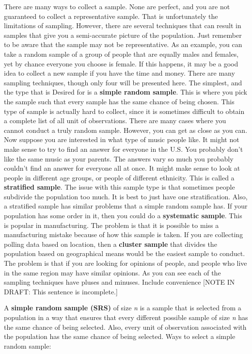 \documentclass[]{book}
\begin{document}
There are many ways to collect a sample. None are perfect, and you are not guaranteed to collect a representative sample. That is unfortunately the limitations of sampling. However, there are several techniques that can result in samples that give you a semi-accurate picture of the population. Just remember to be aware that the sample may not be representative. As an example, you can take a random sample of a group of people that are equally males and females, yet by chance everyone you choose is female. If this happens, it may be a good idea to collect a new sample if you have the time and money.
There are many sampling techniques, though only four will be presented here. The simplest, and the type that is Desired for is a \textbf{simple random sample}. This is where you pick the sample such that every sample has the same chance of being chosen. This type of sample is actually hard to collect, since it is sometimes difficult to obtain a complete list of all unit of observations. There are many cases where you cannot conduct a truly random sample. However, you can get as close as you can. Now suppose you are interested in what type of music people like. It might not make sense to try to find an answer for everyone in the U.S. You probably don't like the same music as your parents. The answers vary so much you probably couldn't find an answer for everyone all at once. It might make sense to look at people in different age groups, or people of different ethnicity. This is called a \textbf{stratified sample}. The issue with this sample type is that sometimes people subdivide the population too much. It is best to just have one stratification. Also, a stratified sample has similar problems that a simple random sample has. If your population has some order in it, then you could do a \textbf{systematic sample}. This is popular in manufacturing. The problem is that it is possible to miss a manufacturing mistake because of how this sample is taken. If you are collecting polling data based on location, then a \textbf{cluster sample} that divides the population based on geographical means would be the easiest sample to conduct. The problem is that if you are looking for opinions of people, and people who live in the same region may have similar opinions. As you can see each of the sampling techniques have pluses and minuses. Include convenience {[}NOTE IN DRAFT: This sentence is incomplete.{]}

A \textbf{simple random sample (SRS)} of size \emph{n} is a sample that is selected from a population in a way that ensures that every different possible sample of size \emph{n} has the same chance of being selected. Also, every unit of observation associated with the population has the same chance of being selected.
Ways to select a simple random sample:
\end{document}
